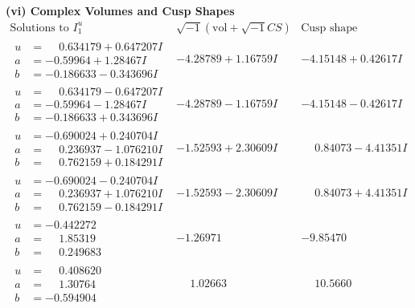 \documentclass[1p]{elsarticle_modified}
\theoremstyle{definition}
\newcommand{\I}{\sqrt{-1}}
\begin{document}
\newpage\flushleft \textbf{(vi) Complex Volumes and Cusp Shapes}
$$\begin{array}{c|c|c}  
\text{Solutions to }I^u_{1}& \I (\text{vol} + \sqrt{-1}CS) & \text{Cusp shape}\\
 \hline 
\begin{aligned}
u &= \phantom{-}0.634179 + 0.647207 I \\
a &= -0.59964 + 1.28467 I \\
b &= -0.186633 - 0.343696 I\end{aligned}
 & -4.28789 + 1.16759 I & -4.15148 + 0.42617 I \\ \hline\begin{aligned}
u &= \phantom{-}0.634179 - 0.647207 I \\
a &= -0.59964 - 1.28467 I \\
b &= -0.186633 + 0.343696 I\end{aligned}
 & -4.28789 - 1.16759 I & -4.15148 - 0.42617 I \\ \hline\begin{aligned}
u &= -0.690024 + 0.240704 I \\
a &= \phantom{-}0.236937 - 1.076210 I \\
b &= \phantom{-}0.762159 + 0.184291 I\end{aligned}
 & -1.52593 + 2.30609 I & \phantom{-}0.84073 - 4.41351 I \\ \hline\begin{aligned}
u &= -0.690024 - 0.240704 I \\
a &= \phantom{-}0.236937 + 1.076210 I \\
b &= \phantom{-}0.762159 - 0.184291 I\end{aligned}
 & -1.52593 - 2.30609 I & \phantom{-}0.84073 + 4.41351 I \\ \hline\begin{aligned}
u &= -0.442272\phantom{ +0.000000I} \\
a &= \phantom{-}1.85319\phantom{ +0.000000I} \\
b &= \phantom{-}0.249683\phantom{ +0.000000I}\end{aligned}
 & -1.26971\phantom{ +0.000000I} & -9.85470\phantom{ +0.000000I} \\ \hline\begin{aligned}
u &= \phantom{-}0.408620\phantom{ +0.000000I} \\
a &= \phantom{-}1.30764\phantom{ +0.000000I} \\
b &= -0.594904\phantom{ +0.000000I}\end{aligned}
 & \phantom{-}1.02663\phantom{ +0.000000I} & \phantom{-}10.5660\phantom{ +0.000000I} \\ \hline\begin{aligned}

\end{aligned}
\end{array}$$
\end{document}
